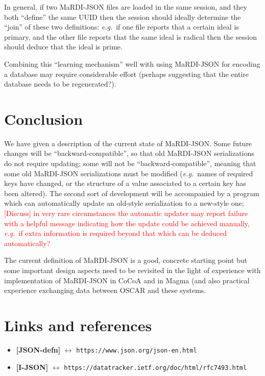 \documentclass{article}
\newcommand{\MaRDIJSON}{MaRDI-JSON}
\newcommand \eg {\textit{e.g.}}
\def\red#1{\textcolor{red}{#1}}
\begin{document}
In general, if two {\MaRDIJSON} files are loaded in the same session,
and they both ``define'' the same UUID then the session should ideally
determine the ``join'' of these two definitions: \eg~if one file
reports that a certain ideal is primary, and the other file reports
that the same ideal is radical then the session should deduce that
the ideal is prime.

Combining this ``learning mechanism'' well with using {\MaRDIJSON}
for encoding a database may require considerable effort (perhaps
suggesting that the entire database needs to be regenerated?).


\section{Conclusion}
\label{sec:conclusion}

We have given a description of the current state of {\MaRDIJSON}.
Some future changes will be ``backward-compatible'', so that old
{\MaRDIJSON} serializations do not require updating; some will not be
``backward-compatible'', meaning that some old {\MaRDIJSON}
serializations must be modified (\eg~names of required keys have
changed, or the structure of a value associated to a certain key has
been altered).  The second sort of development will be accompanied by
a program which can automatically update an old-style serialization to
a new-style one; \red{[Discuss] in very rare circumstances the automatic updater may
  report failure with a helpful message indicating how the update
  could be achieved manually, \eg~if extra information is required
  beyond that which can be deduced automatically?}

The current definition of {\MaRDIJSON} is a good, concrete starting point
but some important design aspects need to be revisited in the light of
experience with implementation of {\MaRDIJSON} in CoCoA and in Magma
(and also practical experience exchanging data between OSCAR and these
systems.

\goodbreak

\section{Links and references}

\begin{itemize}
\item \textbf{[JSON-defn]}  $\leftrightarrow$ \texttt{https://www.json.org/json-en.html}
\item \textbf{[I-JSON]} $\leftrightarrow$  \texttt{https://datatracker.ietf.org/doc/html/rfc7493.html}
\end{itemize}
\end{document}
